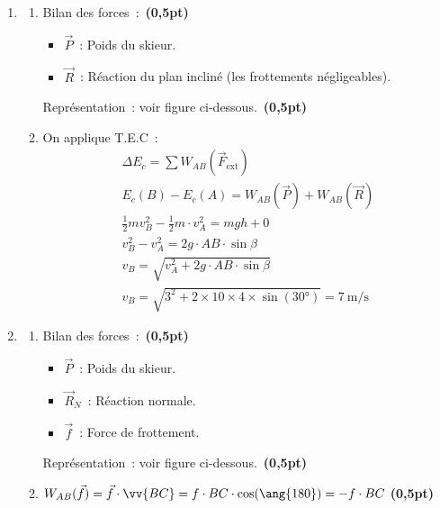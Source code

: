 \begin{enumerate}
    \item
          \begin{enumerate}
              \item Bilan des forces~:~\textbf{(0,5pt)}
                        \begin{itemize}
                            \item $\vec{P}$~: Poids du skieur.
                            \item $\vec{R}$~: Réaction du plan incliné (les
                                  frottements négligeables).
                        \end{itemize}
                    Représentation~: voir figure ci-dessous.~\textbf{(0,5pt)}
              \item On applique T.E.C~:
                    \begin{gather*}
                        \Delta E_{c}=\sum W_{AB}(\vec{F}_{\text{ext}}) \\
                        E_{c}(B)-E_{c}(A)=W_{AB}(\vec{P})+W_{AB}(\vec{R})
                        \tag{0,5pt} \\
                        \frac{1}{2} m v_{B}^{2}-\frac{1}{2} m \cdot v_{A}^{2}=
                        mgh+0 \\
                        v_{B}^{2}-v_{A}^{2}=2 g \cdot AB \cdot \sin \beta \\
                        v_{B}=\sqrt{v_{A}^{2}+2 g \cdot A B \cdot \sin \beta}
                        \tag{0,5pt} \\
                        v_{B}=\sqrt{3^{2}+2\times10\times4\times
                        \sin(\ang{30})}=\qty{7}{\m\per\s}
                        \tag{0,5pt}
                    \end{gather*}
          \end{enumerate}
    \item 
          \begin{enumerate}
              \item Bilan des forces~:~\textbf{(0,5pt)}
                    \begin{itemize}
                        \item $\vec{P}$~: Poids du skieur.
                        \item $\vec{R}_{N}$~: Réaction normale.
                        \item $\vec{f}$~: Force de frottement.
                    \end{itemize}
                    Représentation~: voir figure ci-dessous.~\textbf{(0,5pt)}
              \item $W_{AB}(\vec{f})=\vec{f}\cdot\vv{BC}=
                    f\cdot BC\cdot\cos(\ang{180})=-f\cdot BC$
                    \hfill\textbf{(0,5pt)}
                    

\end{enumerate}
\end{enumerate}
